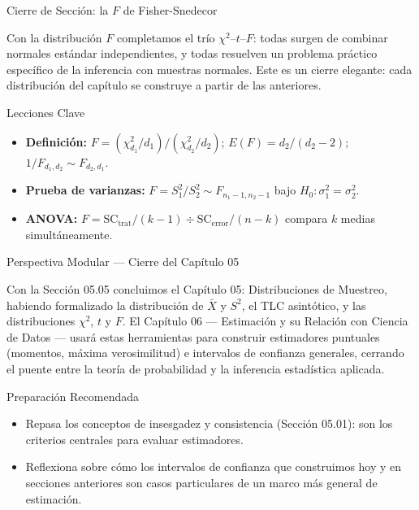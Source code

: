 \documentclass[10pt, aspectratio=169]{beamer}
\begin{document}
\begin{frame}{Cierre de Sección: la $F$ de Fisher-Snedecor}
  \begin{reflexion}
    Con la distribución $F$ completamos el trío $\chi^2$--$t$--$F$: todas surgen de combinar normales estándar independientes, y todas resuelven un problema práctico específico de la inferencia con muestras normales. Este es un cierre elegante: cada distribución del capítulo se construye a partir de las anteriores.
  \end{reflexion}

  \vspace{0.2cm}
  \pause
  \begin{block}{Lecciones Clave}
    \begin{itemize}\itemsep=0.08cm
      \item \textbf{Definición:} $F=(\chi^2_{d_1}/d_1)/(\chi^2_{d_2}/d_2)$; $E(F)=d_2/(d_2-2)$; $1/F_{d_1,d_2}\sim F_{d_2,d_1}$.
      \item \textbf{Prueba de varianzas:} $F=S_1^2/S_2^2\sim F_{n_1-1,n_2-1}$ bajo $H_0:\sigma_1^2=\sigma_2^2$.
      \item \textbf{ANOVA:} $F=\text{SC}_{\text{trat}}/(k-1) \div \text{SC}_{\text{error}}/(n-k)$ compara $k$ medias simultáneamente.
    \end{itemize}
  \end{block}
\end{frame}

\begin{frame}{Perspectiva Modular --- Cierre del Capítulo 05}
  \scriptsize
  \begin{retoclase}
    Con la Sección 05.05 concluimos el Capítulo 05: Distribuciones de Muestreo, habiendo formalizado la distribución de $\bar X$ y $S^2$, el TLC asintótico, y las distribuciones $\chi^2$, $t$ y $F$. El Capítulo 06 --- Estimación y su Relación con Ciencia de Datos --- usará estas herramientas para construir estimadores puntuales (momentos, máxima verosimilitud) e intervalos de confianza generales, cerrando el puente entre la teoría de probabilidad y la inferencia estadística aplicada.
  \end{retoclase}

  \vspace{0.08cm}
  \pause
  \begin{alertblock}{Preparación Recomendada}
    \begin{itemize}\itemsep=0.06cm
      \item Repasa los conceptos de insesgadez y consistencia (Sección 05.01): son los criterios centrales para evaluar estimadores.
      \item Reflexiona sobre cómo los intervalos de confianza que construimos hoy y en secciones anteriores son casos particulares de un marco más general de estimación.
    \end{itemize}
  \end{alertblock}
\end{frame}
\end{document}
